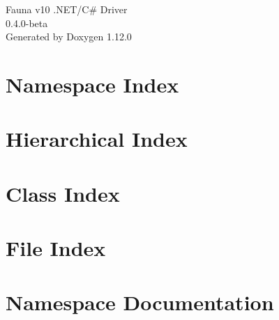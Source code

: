 \documentclass[twoside]{book}
\newcommand{\+}{\discretionary{\mbox{\scriptsize$\hookleftarrow$}}{}{}}
\newcommand{\clearemptydoublepage}{%
    \newpage{\pagestyle{empty}\cleardoublepage}%
  }
\begin{document}
  \raggedbottom
    \hypersetup{pageanchor=false,
                bookmarksnumbered=true,
                pdfencoding=unicode
               }
  \begin{titlepage}
  \vspace*{7cm}
  \begin{center}%
  {\Large Fauna v10 .\+NET/\+C\# Driver}\\
  [1ex]\large 0.\+4.\+0-\/beta \\
  \vspace*{1cm}
  {\large Generated by Doxygen 1.12.0}\\
  \end{center}
  \end{titlepage}
  \clearemptydoublepage
  \tableofcontents
  \clearemptydoublepage
  \hypersetup{pageanchor=true}
\chapter{Namespace Index}

\chapter{Hierarchical Index}

\chapter{Class Index}

\chapter{File Index}

\chapter{Namespace Documentation}









\end{document}
